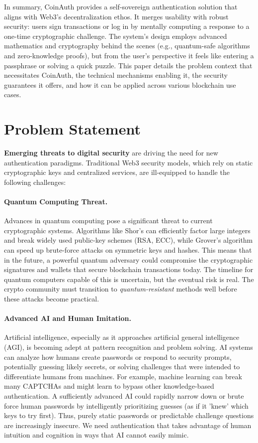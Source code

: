 \documentclass[10pt,letterpaper]{article}
\begin{document}
In summary, CoinAuth provides a self-sovereign authentication solution that aligns with Web3’s decentralization ethos. It merges usability with robust security: users sign transactions or log in by mentally computing a response to a one-time cryptographic challenge. The system’s design employs advanced mathematics and cryptography behind the scenes (e.g., quantum-safe algorithms and zero-knowledge proofs), but from the user’s perspective it feels like entering a passphrase or solving a quick puzzle. This paper details the problem context that necessitates CoinAuth, the technical mechanisms enabling it, the security guarantees it offers, and how it can be applied across various blockchain use cases.

\section{Problem Statement}
\textbf{Emerging threats to digital security} are driving the need for new authentication paradigms. Traditional Web3 security models, which rely on static cryptographic keys and centralized services, are ill-equipped to handle the following challenges:

\paragraph{Quantum Computing Threat.} Advances in quantum computing pose a significant threat to current cryptographic systems. Algorithms like Shor’s can efficiently factor large integers and break widely used public-key schemes (RSA, ECC), while Grover’s algorithm can speed up brute-force attacks on symmetric keys and hashes. This means that in the future, a powerful quantum adversary could compromise the cryptographic signatures and wallets that secure blockchain transactions today. The timeline for quantum computers capable of this is uncertain, but the eventual risk is real. The crypto community must transition to \emph{quantum-resistant} methods well before these attacks become practical.

\paragraph{Advanced AI and Human Imitation.} Artificial intelligence, especially as it approaches artificial general intelligence (AGI), is becoming adept at pattern recognition and problem solving. AI systems can analyze how humans create passwords or respond to security prompts, potentially guessing likely secrets, or solving challenges that were intended to differentiate humans from machines. For example, machine learning can break many CAPTCHAs and might learn to bypass other knowledge-based authentication. A sufficiently advanced AI could rapidly narrow down or brute force human passwords by intelligently prioritizing guesses (as if it 'knew' which keys to try first). Thus, purely static passwords or predictable challenge questions are increasingly insecure. We need authentication that takes advantage of human intuition and cognition in ways that AI cannot easily mimic.
\end{document}
